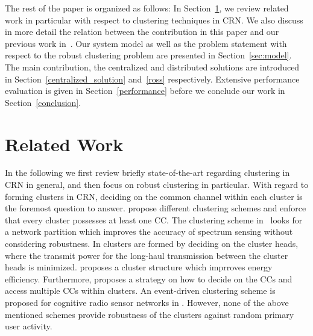\documentclass[times]{ettauth}
\theoremstyle{mytheoremstyle}
\theoremstyle{mytheoremstyle}
\theoremstyle{mytheoremstyle}
\begin{document}
The rest of the paper is organized as follows:
In Section~\ref{related_work}, we review related work in particular with respect to clustering techniques in CRN.
We also discuss in more detail the relation between the contribution in this paper and our previous work in~\cite{Li11_ROSS}.
Our system model as well as the problem statement with respect to the robust clustering problem are presented in Section~\ref{sec:model}. 
The main contribution, the centralized and distributed solutions are introduced in Section~\ref{centralized_solution} and~\ref{ross} respectively.
Extensive performance evaluation is given in Section~\ref{performance} before we conclude our work in Section~\ref{conclusion}.

\section{Related Work}
\label{related_work}
In the following we first review briefly state-of-the-art regarding clustering in CRN in general, and then focus on robust clustering in particular.
With regard to forming clusters in CRN, deciding on the common channel within each cluster is the foremost question to answer.
\cite{Zhao07, Chen07,Affinity_clustering_09icccn} propose different clustering schemes and enforce that every cluster possesses at least one CC.
The clustering scheme in~\cite{Consensus_based_clustering12} looks for a network partition which improves the accuracy of spectrum sensing without considering robustness.
In \cite{TWC2012_cooperative_communication} clusters are formed by deciding on the cluster heads, where the transmit power for the long-haul transmission between the cluster heads is minimized.
\cite{clustering_globecom11} proposes a cluster structure which imprroves energy efficiency.
Furthermore, \cite{cluster_EW10} proposes a strategy on how to decide on the CCs and access multiple CCs within clusters.
An event-driven clustering scheme is proposed for cognitive radio sensor networks in \cite{Ozger_cluster_crsn_13}.
However, none of the above mentioned schemes provide robustness of the clusters against random primary user activity.
\end{document}
